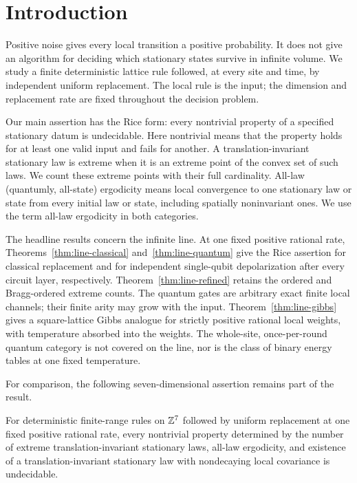 \section{Introduction}\label{sec:intro}
Positive noise gives every local transition a positive probability. It does not give an algorithm for deciding which stationary states survive in infinite volume. We study a finite deterministic lattice rule followed, at every site and time, by independent uniform replacement. The local rule is the input; the dimension and replacement rate are fixed throughout the decision problem.

Our main assertion has the Rice form: every nontrivial property of a specified stationary datum is undecidable. Here nontrivial means that the property holds for at least one valid input and fails for another. A translation-invariant stationary law is extreme when it is an extreme point of the convex set of such laws. We count these extreme points with their full cardinality. All-law (quantumly, all-state) ergodicity means local convergence to one stationary law or state from every initial law or state, including spatially noninvariant ones. We use the term all-law ergodicity in both categories.

The headline results concern the infinite line. At one fixed positive rational
rate, Theorems~\ref{thm:line-classical} and~\ref{thm:line-quantum} give the Rice
assertion for classical replacement and for independent single-qubit
depolarization after every circuit layer, respectively.
Theorem~\ref{thm:line-refined} retains the ordered and Bragg-ordered extreme
counts. The quantum gates are arbitrary exact finite local channels; their
finite arity may grow with the input. Theorem~\ref{thm:line-gibbs} gives a
square-lattice Gibbs analogue for strictly positive rational local weights,
with temperature absorbed into the weights. The whole-site, once-per-round
quantum category is not covered on the line, nor is the class of binary
energy tables at one fixed temperature.

For comparison, the following seven-dimensional assertion remains part of
the result.
\begin{maintheorem}\label{thm:core}
For deterministic finite-range rules on $\mathbb Z^7$ followed by uniform replacement at one fixed positive rational rate, every nontrivial property determined by the number of extreme translation-invariant stationary laws, all-law ergodicity, and existence of a translation-invariant stationary law with nondecaying local covariance is undecidable.
\end{maintheorem}

